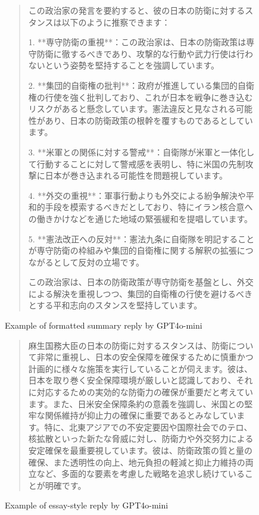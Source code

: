 \documentclass[final,5p,times,twocolumn,authoryear]{elsarticle}
\begin{document}
\begin{figure}[htbp]
    \centering
    \begin{quote}
    \begin{CJK}{UTF8}{min}
      この政治家の発言を要約すると、彼の日本の防衛に対するスタンスは以下のように推察できます：

1. **専守防衛の重視**：この政治家は、日本の防衛政策は専守防衛に徹するべきであり、攻撃的な行動や武力行使は行わないという姿勢を堅持することを強調しています。

2. **集団的自衛権の批判**：政府が推進している集団的自衛権の行使を強く批判しており、これが日本を戦争に巻き込むリスクがあると懸念しています。憲法違反と見なされる可能性があり、日本の防衛政策の根幹を覆すものであるとしています。

3. **米軍との関係に対する警戒**：自衛隊が米軍と一体化して行動することに対して警戒感を表明し、特に米国の先制攻撃に日本が巻き込まれる可能性を問題視しています。

4. **外交の重視**：軍事行動よりも外交による紛争解決や平和的手段を模索するべきだとしており、特にイラン核合意への働きかけなどを通じた地域の緊張緩和を提唱しています。

5. **憲法改正への反対**：憲法九条に自衛隊を明記することが専守防衛の枠組みや集団的自衛権に関する解釈の拡張につながるとして反対の立場です。

この政治家は、日本の防衛政策が専守防衛を基盤とし、外交による解決を重視しつつ、集団的自衛権の行使を避けるべきとする平和志向のスタンスを堅持しています。
    \end{CJK}
    \end{quote}
    \caption{Example of formatted summary reply by GPT4o-mini}
    \label{fig:formatted reply GPT4o-mini summary}
\end{figure}
\begin{figure}[htbp]
    \centering
    \begin{quote}
    \begin{CJK}{UTF8}{min}
     麻生国務大臣の日本の防衛に対するスタンスは、防衛について非常に重視し、日本の安全保障を確保するために慎重かつ計画的に様々な施策を実行していることが伺えます。彼は、日本を取り巻く安全保障環境が厳しいと認識しており、それに対応するための実効的な防衛力の確保が重要だと考えています。また、日米安全保障条約の意義を強調し、米国との堅牢な関係維持が抑止力の確保に重要であるとみなしています。特に、北東アジアでの不安定要因や国際社会でのテロ、核拡散といった新たな脅威に対し、防衛力や外交努力による安定確保を最重要視しています。彼は、防衛政策の質と量の確保、また透明性の向上、地元負担の軽減と抑止力維持の両立など、多面的な要素を考慮した戦略を追求し続けていることが明確です。
    \end{CJK}
    \end{quote}
    \caption{Example of essay-style reply by GPT4o-mini}
    \label{fig:essay reply GPT4o-mini summary}
\end{figure}
\end{document}
